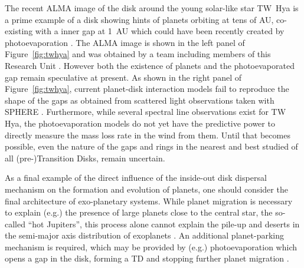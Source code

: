 \documentclass[10pt,fleqn,twoside,a4paper]{article}
\begin{document}
The recent ALMA image of the disk around the young solar-like star TW~Hya is a prime example of a disk showing hints of
planets orbiting at tens of AU,  co-existing with a inner gap at 1~AU
which could have been 
recently created by photoevaporation \citep{2017MNRAS.464L..95E}. The ALMA image
is shown in the left panel of Figure~\ref{fig:twhya} and was obtained by
a team including members of this Research Unit \citep{2016ApJ...820L..40A}. 
However both the existence of planets and the
photoevaporated gap remain speculative at present. As shown in the
right panel of Figure~\ref{fig:twhya}, current planet-disk interaction
models fail to reproduce the shape of the gaps as obtained from
scattered light observations taken with SPHERE \citep{2016arXiv161008939V}. 
Furthermore, while several spectral line observations exist
for TW Hya, the photoevaporation models do not yet have the predictive
power to directly measure the mass loss rate in the wind from
them. Until that becomes possible, even the nature of the gaps and
rings in 
the nearest and best studied of all (pre-)Transition Disks, remain
uncertain. 

As a final example of the direct influence of the inside-out disk dispersal
mechanism on the formation and evolution of planets, one should
consider 
the final architecture of
exo-planetary systems. While planet migration is necessary to explain
(e.g.) the presence of large planets close to the central star, the
so-called ``hot Jupiters'', this process alone cannot explain the pile-up and
deserts in the semi-major axis distribution of exoplanets 
\citep[see also][]{2014ApJ...780...53C, 2015ApJ...798L..32C}. An
additional planet-parking mechanism is required, which may be provided by (e.g.)
photoevaporation which opens a gap in the disk, forming a TD and
stopping further planet migration \citep[e.g.,][]{2012MNRAS.422L..82A, 
2015MNRAS.450.3008E}.

\end{document}
